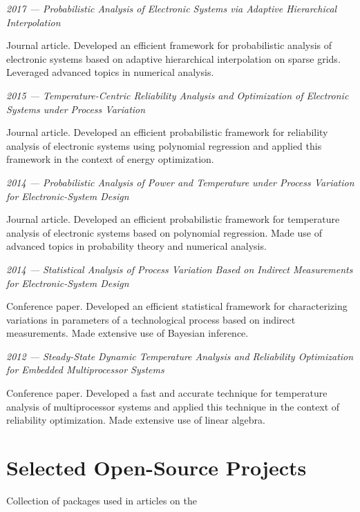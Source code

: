\documentclass[journal]{IEEEtran}
\begin{document}
\emph{2017 --- Probabilistic Analysis of Electronic Systems via Adaptive
Hierarchical Interpolation} \cite{ukhov2017a}

Journal article. Developed an efficient framework for probabilistic analysis of
electronic systems based on adaptive hierarchical interpolation on sparse grids.
Leveraged advanced topics in numerical analysis.

\emph{2015 --- Temperature-Centric Reliability Analysis and Optimization of
Electronic Systems under Process Variation} \cite{ukhov2015}

Journal article. Developed an efficient probabilistic framework for reliability
analysis of electronic systems using polynomial regression and applied this
framework in the context of energy optimization.

\emph{2014 --- Probabilistic Analysis of Power and Temperature under Process
Variation for Electronic-System Design} \cite{ukhov2014b}

Journal article. Developed an efficient probabilistic framework for temperature
analysis of electronic systems based on polynomial regression. Made use of
advanced topics in probability theory and numerical analysis.

\emph{2014 --- Statistical Analysis of Process Variation Based on Indirect
Measurements for Electronic-System Design} \cite{ukhov2014a}

Conference paper. Developed an efficient statistical framework for
characterizing variations in parameters of a technological process based on
indirect measurements. Made extensive use of Bayesian inference.

\emph{2012 --- Steady-State Dynamic Temperature Analysis and Reliability
Optimization for Embedded Multiprocessor Systems} \cite{ukhov2012}

Conference paper. Developed a fast and accurate technique for temperature
analysis of multiprocessor systems and applied this technique in the context of
reliability optimization. Made extensive use of linear algebra.

\section{Selected Open-Source Projects}

\emph{}

Collection of packages used in articles on the
\end{document}
